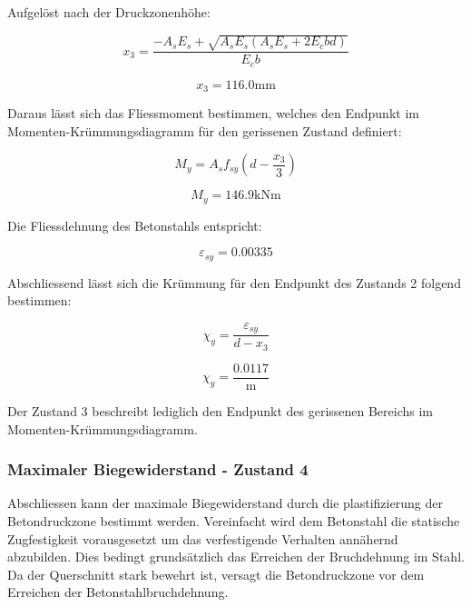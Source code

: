 \documentclass[
  letterpaper,
]{scrreprt}
\begin{document}
Aufgelöst nach der Druckzonenhöhe:

\begin{equation}x_{3} = \frac{- A_{s} E_{s} + \sqrt{A_{s} E_{s} \left(A_{s} E_{s} + 2 E_{c} b d\right)}}{E_{c} b}\end{equation}

\begin{equation}x_{3} = 116.0 \text{mm}\end{equation}

Daraus lässt sich das Fliessmoment bestimmen, welches den Endpunkt im
Momenten-Krümmungsdiagramm für den gerissenen Zustand definiert:

\begin{equation}M_{y} = A_{s} f_{sy} \left(d - \frac{x_{3}}{3}\right)\end{equation}

\begin{equation}M_{y} = 146.9 \text{kN} \text{m}\end{equation}

Die Fliessdehnung des Betonstahls entspricht:

\begin{equation}\varepsilon_{sy} = 0.00335\end{equation}

Abschliessend lässt sich die Krümmung für den Endpunkt des Zustands 2
folgend bestimmen:

\begin{equation}\chi_{y} = \frac{\varepsilon_{sy}}{d - x_{3}}\end{equation}

\begin{equation}\chi_{y} = \frac{0.0117}{\text{m}}\end{equation}

Der Zustand 3 beschreibt lediglich den Endpunkt des gerissenen Bereichs
im Momenten-Krümmungsdiagramm.

\hypertarget{maximaler-biegewiderstand---zustand-4-1}{%
\subsubsection{Maximaler Biegewiderstand - Zustand
4}\label{maximaler-biegewiderstand---zustand-4-1}}

Abschliessen kann der maximale Biegewiderstand durch die plastifizierung
der Betondruckzone bestimmt werden. Vereinfacht wird dem Betonstahl die
statische Zugfestigkeit vorausgesetzt um das verfestigende Verhalten
annähernd abzubilden. Dies bedingt grundsätzlich das Erreichen der
Bruchdehnung im Stahl. Da der Querschnitt stark bewehrt ist, versagt die
Betondruckzone vor dem Erreichen der Betonstahlbruchdehnung.
\end{document}
